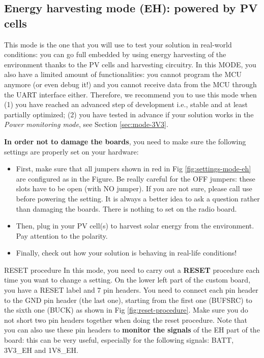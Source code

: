 \clearpage
\subsection{Energy harvesting mode (EH): powered by PV cells} \label{sec:mode-EH}

This mode is the one that you will use to test your solution in real-world conditions: you can go full embedded by using energy harvesting of the environment thanks to the PV cells and harvesting circuitry. In this MODE, you also have a limited amount of functionalities: you cannot program the MCU anymore (or even debug it!) and you cannot receive data from the MCU through the UART interface either. Therefore, we recommend you to use this mode when (1) you have reached an advanced step of development i.e., stable and at least partially optimized; (2) you have tested in advance if your solution works in the \textit{Power monitoring mode}, see Section \ref{sec:mode-3V3}.

\textbf{In order not to damage the boards}, you need to make sure the following settings are properly set on your hardware:

\begin{itemize}
    \item First, make sure that all jumpers shown in red in Fig \ref{fig:settings-mode-eh} are configured as in the Figure.
   Be really careful for the OFF jumpers: these slots have to be open (with NO jumper). If you are not sure, please call use before powering the setting. It is always a better idea to ask a question rather than damaging the boards. There is nothing to set on the radio board.
    \item Then, plug in your PV cell(s) to harvest solar energy from the environment. Pay attention to the polarity.
    \item Finally, check out how your solution is behaving in real-life conditions!
\end{itemize}


\begin{bclogo}[couleur = gray!20, arrondi = 0.2, logo=\bcattention]{RESET procedure}
In this mode, you need to carry out a \textbf{RESET} procedure each time you want to change a setting. On the lower left part of the custom board, you have a RESET label and 7 pin headers. You need to connect each pin header to the GND pin header (the last one), starting from the first one (BUFSRC) to the sixth one (BUCK) as shown in Fig \ref{fig:reset-procedure}. Make sure you do not short two pin headers together when doing the reset procedure. Note that you can also use these pin headers to \textbf{monitor the signals} of the EH part of the board: this can be very useful, especially for the following signals: BATT, 3V3\_EH and 1V8\_EH.
\end{bclogo}

